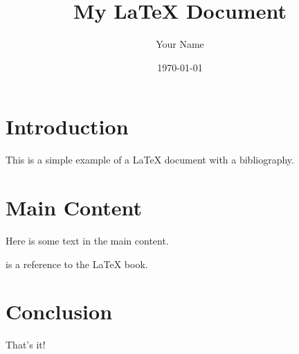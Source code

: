 \documentclass{article}
\begin{document}
\title{My LaTeX Document}
\author{Your Name}
\date{\today}

\maketitle

\section{Introduction}
This is a simple example of a LaTeX document with a bibliography.

\section{Main Content}
Here is some text in the main content.

\cite{lamport1994latex} is a reference to the LaTeX book.

\section{Conclusion}
That's it!



\end{document}
